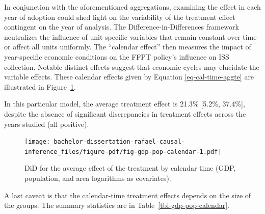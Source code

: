 \documentclass[12pt, a4paper, twoside]{article}
\numberwithin{equation}{subsection} %
\begin{document}
In conjunction with the aforementioned aggregations, examining the
effect in each year of adoption could shed light on the variability of
the treatment effect contingent on the year of analysis. The
Difference-in-Differences framework neutralizes the influence of
unit-specific variables that remain constant over time or affect all
units uniformly. The ``calendar effect'' then measures the impact of
year-specific economic conditions on the FFPT policy's influence on ISS
collection. Notable distinct effects suggest that economic cycles may
elucidate the variable effects. These calendar effects given by Equation
\eqref{eq-cal-time-aggte} are illustrated in
Figure~\ref{fig-gdp-pop-calendar}.

In this particular model, the average treatment effect is 21.3\%
{[}5.2\%, 37.4\%{]}, despite the absence of significant discrepancies in
treatment effects across the years studied (all positive).

\begin{figure}[H]

{\centering \texttt{[image: bachelor-dissertation-rafael-causal-inference\_files/figure-pdf/fig-gdp-pop-calendar-1.pdf]}

}

\caption{\label{fig-gdp-pop-calendar}DiD for the average effect of the
treatment by calendar time (GDP, population, and area logarithms as
covariates).}

\end{figure}

A last caveat is that the calendar-time treatment effects depends on the
size of the groups. The summary statistics are in
Table~\ref{tbl-gdp-pop-calendar}.
\end{document}
